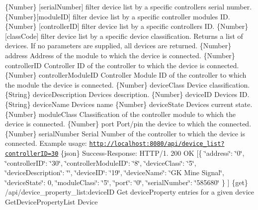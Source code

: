 \{Number\} \mbox{[}serial\+Number\mbox{]} filter device list by a specific controller\textquotesingle{}s serial number.  \{Number\}\mbox{[}module\+ID\mbox{]} filter device list by a specific controller module\textquotesingle{}s ID.  \{Number\} \mbox{[}controller\+ID\mbox{]} filter device list by a specific controller\textquotesingle{}s ID.  \{Number\} \mbox{[}class\+Code\mbox{]} filter device list by a specific device classification.  Returns a list of devices. If no parameters are supplied, all devices are returned.  \{Number\} address Address of the module to which the device is connected.  \{Number\} controller\+ID Controller ID of the controller to which the device is connected.  \{Number\} controller\+Module\+ID Controller Module ID of the controller to which the module the device is connected.  \{Number\} device\+Class Device classification.  \{String\} device\+Description Device\textquotesingle{}s description.  \{Number\} device\+ID Device\textquotesingle{}s ID.  \{String\} device\+Name Device\textquotesingle{}s name  \{Number\} device\+State Device\textquotesingle{}s current state.  \{Number\} module\+Class Classification of the controller module to which the device is connected.  \{Number\} port Port/pin the device to which the connected.  \{Number\} serial\+Number Serial Number of the controller to which the device is connected.  Example usage\+: \href{http://localhost:8080/api/device_list?controllerID=30}{\tt http\+://localhost\+:8080/api/device\+\_\+list?controller\+I\+D=30}  \{json\} Success-\/\+Response\+: H\+T\+T\+P/1. 200 OK \mbox{[}\{ \char`\"{}address\char`\"{}\+: \char`\"{}0\char`\"{}, \char`\"{}controller\+I\+D\char`\"{}\+: \char`\"{}30\char`\"{}, \char`\"{}controller\+Module\+I\+D\char`\"{}\+: \char`\"{}8\char`\"{}, \char`\"{}device\+Class\char`\"{}\+: \char`\"{}5\char`\"{}, \char`\"{}device\+Description\char`\"{}\+: \char`\"{}\char`\"{}, \char`\"{}device\+I\+D\char`\"{}\+: \char`\"{}19\char`\"{}, \char`\"{}device\+Name\char`\"{}\+: \char`\"{}\+G\+K Mine Signal\char`\"{}, \char`\"{}device\+State\char`\"{}\+: 0, \char`\"{}module\+Class\char`\"{}\+: \char`\"{}5\char`\"{}, \char`\"{}port\char`\"{}\+: \char`\"{}0\char`\"{}, \char`\"{}serial\+Number\char`\"{}\+: \char`\"{}585680\char`\"{} \} \mbox{]}  \{get\} /api/device\+\_\+property\+\_\+list\+:device\+ID Get device\+Property entries for a given device  Get\+Device\+Property\+List  Device

